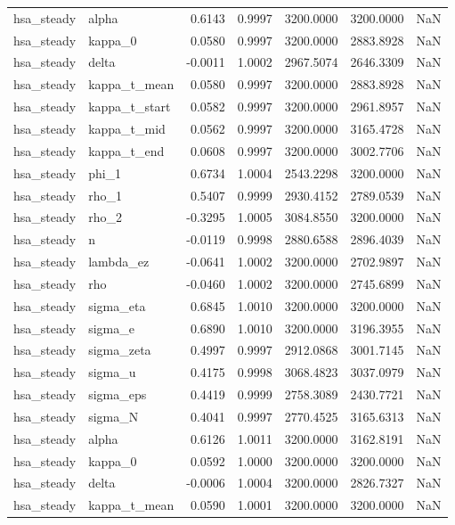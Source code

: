 \begin{tabular}{llrrrrl}
hsa\_steady & alpha & 0.6143 & 0.9997 & 3200.0000 & 3200.0000 & NaN \\
hsa\_steady & kappa\_0 & 0.0580 & 0.9997 & 3200.0000 & 2883.8928 & NaN \\
hsa\_steady & delta & -0.0011 & 1.0002 & 2967.5074 & 2646.3309 & NaN \\
hsa\_steady & kappa\_t\_mean & 0.0580 & 0.9997 & 3200.0000 & 2883.8928 & NaN \\
hsa\_steady & kappa\_t\_start & 0.0582 & 0.9997 & 3200.0000 & 2961.8957 & NaN \\
hsa\_steady & kappa\_t\_mid & 0.0562 & 0.9997 & 3200.0000 & 3165.4728 & NaN \\
hsa\_steady & kappa\_t\_end & 0.0608 & 0.9997 & 3200.0000 & 3002.7706 & NaN \\
hsa\_steady & phi\_1 & 0.6734 & 1.0004 & 2543.2298 & 3200.0000 & NaN \\
hsa\_steady & rho\_1 & 0.5407 & 0.9999 & 2930.4152 & 2789.0539 & NaN \\
hsa\_steady & rho\_2 & -0.3295 & 1.0005 & 3084.8550 & 3200.0000 & NaN \\
hsa\_steady & n & -0.0119 & 0.9998 & 2880.6588 & 2896.4039 & NaN \\
hsa\_steady & lambda\_ez & -0.0641 & 1.0002 & 3200.0000 & 2702.9897 & NaN \\
hsa\_steady & rho & -0.0460 & 1.0002 & 3200.0000 & 2745.6899 & NaN \\
hsa\_steady & sigma\_eta & 0.6845 & 1.0010 & 3200.0000 & 3200.0000 & NaN \\
hsa\_steady & sigma\_e & 0.6890 & 1.0010 & 3200.0000 & 3196.3955 & NaN \\
hsa\_steady & sigma\_zeta & 0.4997 & 0.9997 & 2912.0868 & 3001.7145 & NaN \\
hsa\_steady & sigma\_u & 0.4175 & 0.9998 & 3068.4823 & 3037.0979 & NaN \\
hsa\_steady & sigma\_eps & 0.4419 & 0.9999 & 2758.3089 & 2430.7721 & NaN \\
hsa\_steady & sigma\_N & 0.4041 & 0.9997 & 2770.4525 & 3165.6313 & NaN \\
hsa\_steady & alpha & 0.6126 & 1.0011 & 3200.0000 & 3162.8191 & NaN \\
hsa\_steady & kappa\_0 & 0.0592 & 1.0000 & 3200.0000 & 3200.0000 & NaN \\
hsa\_steady & delta & -0.0006 & 1.0004 & 3200.0000 & 2826.7327 & NaN \\
hsa\_steady & kappa\_t\_mean & 0.0590 & 1.0001 & 3200.0000 & 3200.0000 & NaN \\

\end{tabular}
